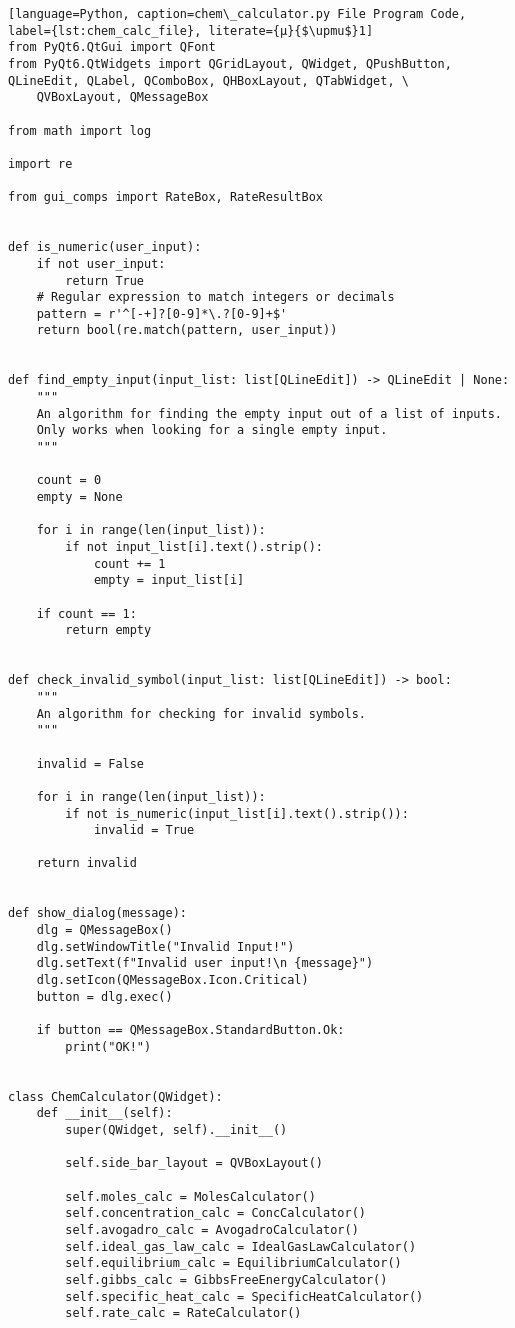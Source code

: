 
\begin{lstlisting}[language=Python, caption=chem\_calculator.py File Program Code, label={lst:chem_calc_file}, literate={μ}{$\upmu$}1]
from PyQt6.QtGui import QFont
from PyQt6.QtWidgets import QGridLayout, QWidget, QPushButton, QLineEdit, QLabel, QComboBox, QHBoxLayout, QTabWidget, \
    QVBoxLayout, QMessageBox

from math import log

import re

from gui_comps import RateBox, RateResultBox


def is_numeric(user_input):
    if not user_input:
        return True
    # Regular expression to match integers or decimals
    pattern = r'^[-+]?[0-9]*\.?[0-9]+$'
    return bool(re.match(pattern, user_input))


def find_empty_input(input_list: list[QLineEdit]) -> QLineEdit | None:
    """
    An algorithm for finding the empty input out of a list of inputs.
    Only works when looking for a single empty input.
    """

    count = 0
    empty = None

    for i in range(len(input_list)):
        if not input_list[i].text().strip():
            count += 1
            empty = input_list[i]

    if count == 1:
        return empty


def check_invalid_symbol(input_list: list[QLineEdit]) -> bool:
    """
    An algorithm for checking for invalid symbols.
    """

    invalid = False

    for i in range(len(input_list)):
        if not is_numeric(input_list[i].text().strip()):
            invalid = True

    return invalid


def show_dialog(message):
    dlg = QMessageBox()
    dlg.setWindowTitle("Invalid Input!")
    dlg.setText(f"Invalid user input!\n {message}")
    dlg.setIcon(QMessageBox.Icon.Critical)
    button = dlg.exec()

    if button == QMessageBox.StandardButton.Ok:
        print("OK!")


class ChemCalculator(QWidget):
    def __init__(self):
        super(QWidget, self).__init__()

        self.side_bar_layout = QVBoxLayout()

        self.moles_calc = MolesCalculator()
        self.concentration_calc = ConcCalculator()
        self.avogadro_calc = AvogadroCalculator()
        self.ideal_gas_law_calc = IdealGasLawCalculator()
        self.equilibrium_calc = EquilibriumCalculator()
        self.gibbs_calc = GibbsFreeEnergyCalculator()
        self.specific_heat_calc = SpecificHeatCalculator()
        self.rate_calc = RateCalculator()


\end{lstlisting}
